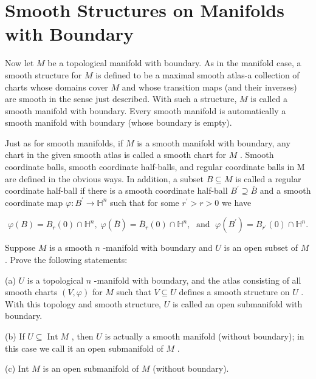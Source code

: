 \section{Smooth Structures on Manifolds with Boundary}

\begin{definition}
\label{def:1-6-extra-2}
\leanok
Now let $M$ be a topological manifold with boundary. As in the manifold case, a smooth structure for $M$ is defined to be a maximal smooth atlas-a collection of charts whose domains cover $M$ and whose transition maps (and their inverses) are smooth in the sense just described. With such a structure, $M$ is called a smooth manifold with boundary. Every smooth manifold is automatically a smooth manifold with boundary (whose boundary is empty).
\end{definition}

\begin{definition}
\label{def:1-6-extra-3}
\leanok
Just as for smooth manifolds, if $M$ is a smooth manifold with boundary, any chart in the given smooth atlas is called a smooth chart for $M$ . Smooth coordinate balls, smooth coordinate half-balls, and regular coordinate balls in M are defined in the obvious ways. In addition, a subset $B \subseteq  M$ is called a regular coordinate half-ball if there is a smooth coordinate half-ball ${B}^{\prime } \supseteq  \bar{B}$ and a smooth coordinate map $\varphi  : {B}^{\prime } \rightarrow  {\mathbb{H}}^{n}$ such that for some ${r}^{\prime } > r > 0$ we have

\[
\varphi \left( B\right)  = {B}_{r}\left( 0\right)  \cap  {\mathbb{H}}^{n},\;\varphi \left( \bar{B}\right)  = {\bar{B}}_{r}\left( 0\right)  \cap  {\mathbb{H}}^{n},\;\text{ and }\;\varphi \left( {B}^{\prime }\right)  = {B}_{{r}^{\prime }}\left( 0\right)  \cap  {\mathbb{H}}^{n}.
\]
\end{definition}

\begin{exercise}
\label{exer:1-44}
\leanok
{}
Suppose $M$ is a smooth $n$ -manifold with boundary and $U$ is an open subset of $M$ . Prove the following statements:

(a) $U$ is a topological $n$ -manifold with boundary, and the atlas consisting of all smooth charts $\left( {V,\varphi }\right)$ for $M$ such that $V \subseteq  U$ defines a smooth structure on $U$ . With this topology and smooth structure, $U$ is called an open submanifold with boundary.

(b) If $U \subseteq  \operatorname{Int}M$ , then $U$ is actually a smooth manifold (without boundary); in this case we call it an open submanifold of $M$ .

(c) Int $M$ is an open submanifold of $M$ (without boundary).
\end{exercise}


